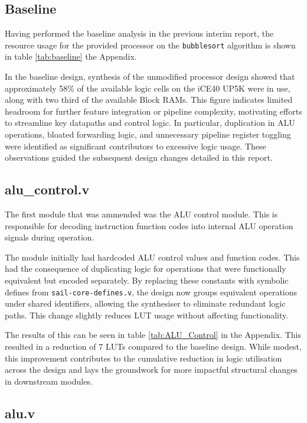 \documentclass[a4paper,10pt]{article}
\begin{document}
\subsection{Baseline}
\label{sec:Baseline}

Having performed the baseline analysis in the previous interim report,
the resource usage for the provided processor on the \texttt{bubblesort}
algorithm is shown in table \ref{tab:baseline} the Appendix.

In the baseline design, 
synthesis of the unmodified processor design showed that approximately 
58\% of the available logic cells on the iCE40 UP5K were in use,
along with two third of the available Block RAMs. 
This figure indicates limited headroom for 
further feature integration or pipeline complexity, 
motivating efforts to streamline key datapaths and control logic. 
In particular, duplication in ALU operations, bloated forwarding logic, 
and unnecessary pipeline register toggling were identified 
as significant contributors to excessive logic usage. 
These observations guided the subsequent design changes detailed in this report.

\subsection{alu\_control.v}
\label{sec:alu_control.v}

The first module that was ammended was the ALU control module.
This is responsible for decoding instruction function codes into internal
ALU operation signals during operation.

The module initially had hardcoded ALU control values and function codes.
This had the consequence of duplicating logic for operations 
that were functionally equivalent but encoded separately. 
By replacing these constants with symbolic defines from 
\texttt{sail-core-defines.v}, 
the design now groups equivalent operations under shared identifiers, 
allowing the synthesiser to eliminate redundant logic paths. 
This change slightly reduces LUT usage without affecting functionality.

The results of this can be seen in table 
\ref{tab:ALU_Control} in the Appendix.
This resulted in a reduction of 7 LUTs compared to the baseline design.
While modest, this improvement contributes to the cumulative reduction 
in logic utilisation across the design and 
lays the groundwork for more impactful structural changes in downstream modules.

\subsection{alu.v}
\label{sec:alu.v}
\end{document}
